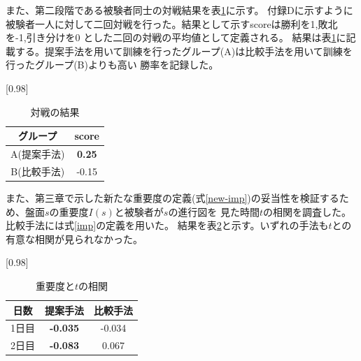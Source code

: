 \begin{table}[H]
    \caption{先読み手数制限なしの場合}
    \scriptsize
    \centering
    \label{table:system-100}
\end{table}
また、第二段階である被験者同士の対戦結果を表\ref{table:result-battle}に示す。
付録Dに示すように被験者一人に対して二回対戦を行った。結果として示すscoreは勝利を1,敗北を-1,引き分けを0
とした二回の対戦の平均値として定義される。
結果は表\ref{table:result-battle}に記載する。提案手法を用いて訓練を行ったグループ(A)は比較手法を用いて訓練を行ったグループ(B)よりも高い
勝率を記録した。
\begin{table}[H]
	\caption{対戦の結果}
    \label{table:result-battle}
	\centering
	\scalebox{0.98}[0.98]{
		\begin{tabular}{c|c}
			グループ & score \\ \hline
			A(提案手法)    & \bf{0.25} \\ 
			B(比較手法)    & -0.15 \\
		\end{tabular}
	}
	
\end{table}
また、第三章で示した新たな重要度の定義(式\ref{new-imp})の妥当性を検証するため、盤面$s$の重要度$I(s)$と被験者が$s$の進行図を
見た時間$t$の相関を調査した。比較手法には式\ref{imp}の定義を用いた。
結果を表\ref{table:result-imp}と示す。いずれの手法も$t$との有意な相関が見られなかった。
\begin{table}[H]
	\caption{重要度と$t$の相関}
    \label{table:result-imp}
	\centering
	\scalebox{0.98}[0.98]{
		\begin{tabular}{c|c|c}
			日数& 提案手法 & 比較手法 \\ \hline
			1日目& \bf{-0.035}& -0.034\\
            2日目& \bf{-0.083}& 0.067\\
		\end{tabular}
	}
	
\end{table}


